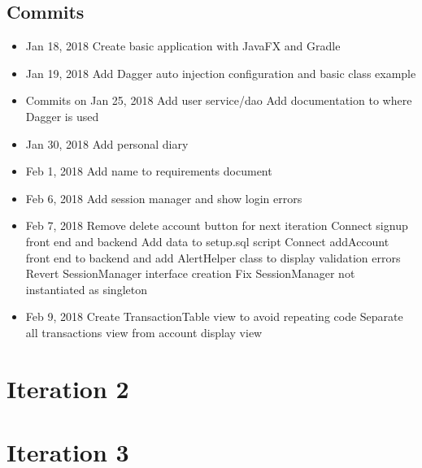 \documentclass[12pt]{article}
\begin{document}
\subsection{Commits}
\begin{itemize}
    \item Jan 18, 2018
        \subitem [FEAT] Create basic application with JavaFX and Gradle
    \item Jan 19, 2018
        \subitem [FEAT] Add Dagger auto injection configuration and basic class example
    \item Commits on Jan 25, 2018
        \subitem [FEAT] Add user service/dao
        \subitem [DOC] Add documentation to where Dagger is used
    \item Jan 30, 2018
        \subitem [DOC] Add personal diary
    \item Feb 1, 2018
        \subitem [DOC] Add name to requirements document
    \item Feb 6, 2018
        \subitem [FEAT] Add session manager and show login errors
    \item Feb 7, 2018
        \subitem [FIX] Remove delete account button for next iteration
        \subitem [FEAT] Connect signup front end and backend
        \subitem [BUILD] Add data to setup.sql script
        \subitem [FEAT] Connect addAccount front end to backend and add AlertHelper class to display validation errors
        \subitem [REFACTOR] Revert SessionManager interface creation
        \subitem [FIX] Fix SessionManager not instantiated as singleton
    \item Feb 9, 2018
        \subitem [REFACTOR] Create TransactionTable view to avoid repeating code
        \subitem [REFACTOR] Separate all transactions view from account display view
\end{itemize}


\section{Iteration 2}

\section{Iteration 3}
\end{document}
